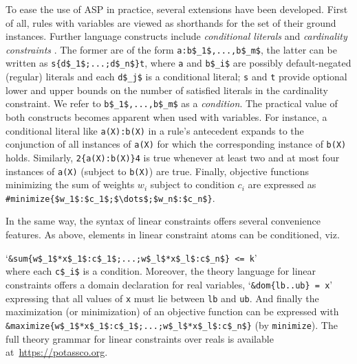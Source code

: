 To ease the use of ASP in practice,
several extensions have been developed.
First of all, rules with variables are viewed as shorthands for the set of their ground instances.
Further language constructs include
\emph{conditional literals} and \emph{cardinality constraints} \citep{siniso02a}.
The former are of the form
\lstinline[mathescape=true]{a:b$_1$,...,b$_m$},
the latter can be written as
\lstinline[mathescape=true]+s{d$_1$;...;d$_n$}t+,
where \lstinline{a} and \lstinline[mathescape=true]{b$_i$} are possibly default-negated (regular) literals  %
and each \lstinline[mathescape=true]{d$_j$} is a conditional literal; %
\lstinline{s} and \lstinline{t} provide optional lower and upper bounds on the number of satisfied literals in the cardinality constraint.
We refer to \lstinline[mathescape=true]{b$_1$,...,b$_m$} as a \emph{condition}.
%
The practical value of both constructs becomes apparent when used with variables.
For instance, a conditional literal like
\lstinline[mathescape=true]{a(X):b(X)}
in a rule's antecedent expands to the conjunction of all instances of \lstinline{a(X)} for which the corresponding instance of \lstinline{b(X)} holds.
%
Similarly,
\lstinline[mathescape=true]+2{a(X):b(X)}4+
is true whenever at least two and at most four instances of \lstinline{a(X)} (subject to \lstinline{b(X)}) are true.
%
Finally, objective functions minimizing the sum of weights $w_i$ subject to condition $c_i$ are expressed as
\lstinline[mathescape=true]!#minimize{$w_1$:$c_1$;$\dots$;$w_n$:$c_n$}!.

In the same way,
the syntax of linear constraints offers several convenience features.
As above,
elements in linear constraint atoms can be conditioned,
viz.\par
`\lstinline[mathescape=true]@&sum{w$_1$*x$_1$:c$_1$;...;w$_l$*x$_l$:c$_n$} <= k@'
\\
where each \lstinline[mathescape=true]{c$_i$} is a condition.
Moreover, the theory language for linear constraints offers a domain declaration for real variables,
`\lstinline[mathescape=true]@&dom{lb..ub} = x@'
expressing that all values of \texttt{x} must lie between \texttt{lb} and \texttt{ub}.
And finally the maximization (or minimization) of an objective function can be expressed with
\lstinline[mathescape=true]@&maximize{w$_1$*x$_1$:c$_1$;...;w$_l$*x$_l$:c$_n$}@
(by \texttt{minimize}).
The full theory grammar for linear constraints over reals is available at~\url{https://potassco.org}.

